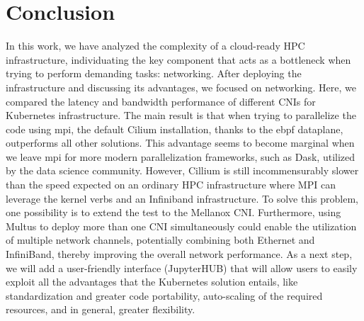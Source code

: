 \section*{Conclusion}

In this work, we have analyzed the complexity of a cloud-ready HPC
infrastructure, individuating the key component that acts as a bottleneck when
trying to perform demanding tasks: networking.
After deploying the infrastructure and discussing its advantages, we focused on
networking. Here, we compared the latency and bandwidth performance of different
CNIs for Kubernetes infrastructure.
The main result is that when trying to parallelize the code using mpi, the
default Cilium installation, thanks to the ebpf dataplane, outperforms all other
solutions.
This advantage seems to become marginal when we leave mpi for more modern
parallelization frameworks, such as Dask, utilized by the data science
community.
However, Cillium is still incommensurably slower than the speed expected on an
ordinary HPC infrastructure where MPI can leverage the kernel verbs and an
Infiniband infrastructure.
To solve this problem, one possibility is to extend the test to the Mellanox CNI.
Furthermore, using Multus to deploy more than one CNI simultaneously could
enable the utilization of multiple network channels, potentially combining both
Ethernet and InfiniBand, thereby improving the overall network performance.
As a next step, we will add a user-friendly interface (JupyterHUB) that will
allow users to easily exploit all the advantages that the Kubernetes solution
entails, like standardization and greater code portability, auto-scaling of the
required resources, and in general, greater flexibility.
